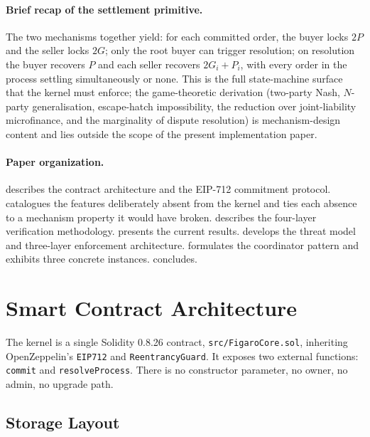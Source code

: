 \documentclass[11pt,a4paper]{article}
\theoremstyle{definition}
\theoremstyle{remark}
\newcommand{\pay}{P}
\newcommand{\cumval}{G}
\begin{document}
\paragraph{Brief recap of the settlement primitive.}
The two mechanisms together yield: for each committed order, the
buyer locks $2\pay$ and the seller locks $2\cumval$; only the root
buyer can trigger resolution; on resolution the buyer recovers $\pay$
and each seller recovers $2\cumval_i + \pay_i$, with every order in
the process settling simultaneously or none. This is the full
state-machine surface that the kernel must enforce; the
game-theoretic derivation (two-party Nash, $N$-party generalisation,
escape-hatch impossibility, the reduction over joint-liability
microfinance, and the marginality of dispute resolution) is
mechanism-design content and lies outside the scope of the present
implementation paper.

\paragraph{Paper organization.}
 describes the contract architecture and the
EIP-712 commitment protocol.  catalogues the
features deliberately absent from the kernel and ties each absence
to a mechanism property it would have broken.
 describes the four-layer verification
methodology.  presents the current
results.  develops the threat model and
three-layer enforcement architecture.
 formulates the coordinator pattern and
exhibits three concrete instances.  concludes.

\section{Smart Contract Architecture}
\label{sec:architecture}

The kernel is a single Solidity 0.8.26 contract,
\texttt{src/FigaroCore.sol}, inheriting OpenZeppelin's \texttt{EIP712}
and \texttt{ReentrancyGuard}. It exposes two external functions:
\texttt{commit} and \texttt{resolveProcess}. There is no constructor
parameter, no owner, no admin, no upgrade path.

\subsection{Storage Layout}
\end{document}
